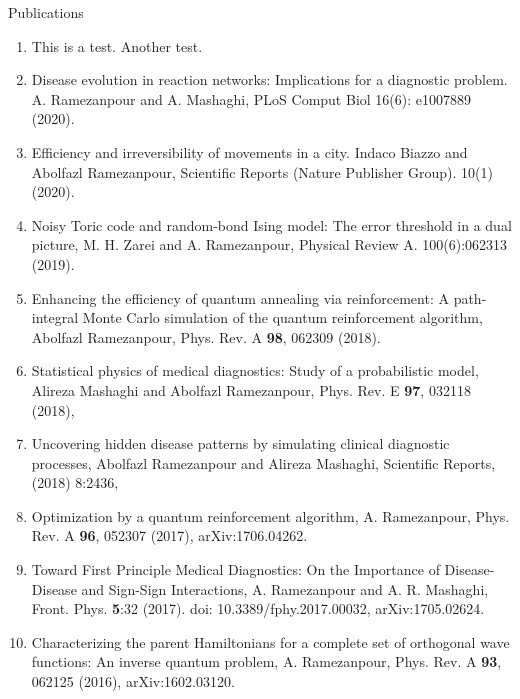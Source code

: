 \documentclass[aps,preprint]{revtex4-1}
\begin{document}
\begin{center}
\begin{large}Publications\end{large}
\end{center}


\begin{enumerate}

\item This is a test. Another test.

\item Disease evolution in reaction networks: Implications for a diagnostic problem. A. Ramezanpour and A. Mashaghi, PLoS Comput Biol 16(6): e1007889 (2020).
  
\item Efficiency and irreversibility of movements in a city. Indaco Biazzo and Abolfazl Ramezanpour, Scientific Reports (Nature Publisher Group). 10(1) (2020). 

\item Noisy Toric code and random-bond Ising model: The error threshold in a dual picture, M. H. Zarei and A. Ramezanpour, Physical Review A. 100(6):062313 (2019). 

\item Enhancing the efficiency of quantum annealing via reinforcement: A path-integral Monte Carlo
simulation of the quantum reinforcement algorithm, Abolfazl Ramezanpour, Phys. Rev. A \textbf{98}, 062309 (2018).


\item Statistical physics of medical diagnostics: Study of a probabilistic model, Alireza Mashaghi and Abolfazl Ramezanpour, Phys. Rev. E \textbf{97}, 032118 (2018),


\item Uncovering hidden disease patterns by simulating clinical diagnostic processes, Abolfazl Ramezanpour and Alireza Mashaghi, Scientific Reports, (2018) 8:2436,


\item Optimization by a quantum reinforcement algorithm, A. Ramezanpour, Phys. Rev. A \textbf{96}, 052307 (2017),  arXiv:1706.04262.

\item Toward First Principle Medical Diagnostics: On the Importance of Disease-Disease and Sign-Sign Interactions, A. Ramezanpour and A. R. Mashaghi, Front. Phys. \textbf{5}:32 (2017). doi: 10.3389/fphy.2017.00032,  arXiv:1705.02624.

\item  Characterizing the parent Hamiltonians for a complete set of orthogonal wave functions: An inverse quantum problem, A. Ramezanpour, Phys. Rev. A \textbf{93}, 062125 (2016),  arXiv:1602.03120.


\end{enumerate}
\end{document}
